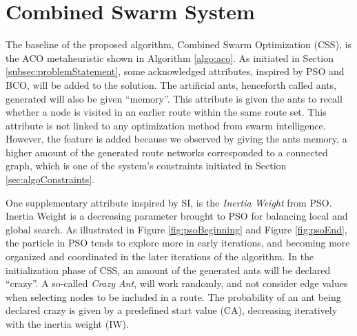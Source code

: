 \section{Combined Swarm System}
\label{section:methodDescription}

The baseline of the proposed algorithm, Combined Swarm Optimization (CSS), is the ACO metaheuristic shown in Algorithm \vref{algo:aco}. As initiated in Section \vref{subsec:problemStatement}, some acknowledged attributes, inspired by PSO and BCO, will be added to the solution. The artificial ants, henceforth called ants, generated will also be given ``memory''. This attribute is given the ants to recall whether a node is visited in an earlier route within the same route set.  This attribute is not linked to any optimization method from swarm intelligence. However, the feature is added because we observed by giving the ants memory, a higher amount of the generated route networks corresponded to a connected graph, which is one of the system's constraints initiated in Section \vref{sec:algoConstraints}.

One supplementary attribute inspired by SI, is the \textit{Inertia Weight} from PSO. Inertia Weight is a decreasing parameter brought to PSO for balancing local and global search. As illustrated in Figure \vref{fig:psoBeginning} and Figure \vref{fig:psoEnd}, the particle in PSO tends to explore more in early iterations, and becoming more organized and coordinated in the later iterations of the algorithm. In the initialization phase of CSS, an amount of the generated ants will be declared ``crazy''. A so-called \textit{Crazy Ant}, will work randomly, and not consider edge values when selecting nodes to be included in a route. The probability of an ant being declared crazy is given by a predefined start value (CA), decreasing iteratively with the inertia weight (IW). %



